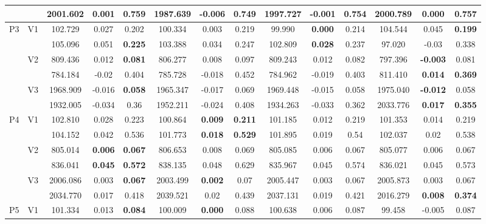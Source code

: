 \documentclass[12pt,a4paper]{article}
\begin{document}
\begin{sidewaystable}[ht]
{\begin{tabular}{cc|ccc|ccc|ccc|ccc|}
   &  & 2001.602 & 0.001 & 0.759 & 1987.639 & -0.006 & \textbf{0.749} & 1997.727 & -0.001 & 0.754 & 2000.789 & \textbf{0.000} & 0.757 \\ 
   \hline \hline\multirow{6}{*}{P3} & \multirow{2}{*}{V1} & 102.729 & 0.027 & 0.202 & 100.334 & 0.003 & 0.219 & 99.990 & \textbf{0.000} & 0.214 & 104.544 & 0.045 & \textbf{0.199} \\ 
   &  & 105.096 & 0.051 & \textbf{0.225} & 103.388 & 0.034 & 0.247 & 102.809 & \textbf{0.028} & 0.237 & 97.020 & -0.03 & 0.338 \\ 
   & \multirow{2}{*}{V2} & 809.436 & 0.012 & \textbf{0.081} & 806.277 & 0.008 & 0.097 & 809.243 & 0.012 & 0.082 & 797.396 & \textbf{-0.003} & 0.081 \\ 
   &  & 784.184 & -0.02 & 0.404 & 785.728 & -0.018 & 0.452 & 784.962 & -0.019 & 0.403 & 811.410 & \textbf{0.014} & \textbf{0.369} \\ 
   & \multirow{2}{*}{V3} & 1968.909 & -0.016 & \textbf{0.058} & 1965.347 & -0.017 & 0.069 & 1969.448 & -0.015 & 0.058 & 1975.040 & \textbf{-0.012} & 0.058 \\ 
   &  & 1932.005 & -0.034 & 0.36 & 1952.211 & -0.024 & 0.408 & 1934.263 & -0.033 & 0.362 & 2033.776 & \textbf{0.017} & \textbf{0.355} \\ 
   \hline \hline\multirow{6}{*}{P4} & \multirow{2}{*}{V1} & 102.810 & 0.028 & 0.223 & 100.864 & \textbf{0.009} & \textbf{0.211} & 101.185 & 0.012 & 0.219 & 101.353 & 0.014 & 0.219 \\ 
   &  & 104.152 & 0.042 & 0.536 & 101.773 & \textbf{0.018} & \textbf{0.529} & 101.895 & 0.019 & 0.54 & 102.037 & 0.02 & 0.538 \\ 
   & \multirow{2}{*}{V2} & 805.014 & \textbf{0.006} & \textbf{0.067} & 806.653 & 0.008 & 0.069 & 805.085 & 0.006 & 0.067 & 805.077 & 0.006 & 0.067 \\ 
   &  & 836.041 & \textbf{0.045} & \textbf{0.572} & 838.135 & 0.048 & 0.629 & 835.967 & 0.045 & 0.574 & 836.021 & 0.045 & 0.573 \\ 
   & \multirow{2}{*}{V3} & 2006.086 & 0.003 & \textbf{0.067} & 2003.499 & \textbf{0.002} & 0.07 & 2005.447 & 0.003 & 0.067 & 2005.873 & 0.003 & 0.067 \\ 
   &  & 2034.770 & 0.017 & 0.418 & 2039.521 & 0.02 & 0.439 & 2037.131 & 0.019 & 0.421 & 2016.279 & \textbf{0.008} & \textbf{0.374} \\ 
   \hline \hline\multirow{6}{*}{P5} & \multirow{2}{*}{V1} & 101.334 & 0.013 & \textbf{0.084} & 100.009 & \textbf{0.000} & 0.088 & 100.638 & 0.006 & 0.087 & 99.458 & -0.005 & 0.087 \\ 

\end{tabular}}
\end{sidewaystable}
\end{document}
